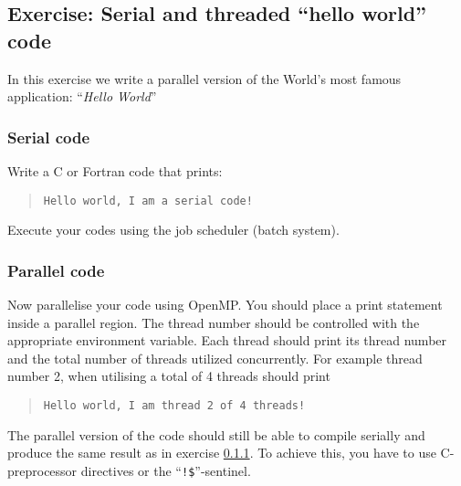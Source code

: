\subsection{Exercise: Serial and threaded ``hello world'' code}
In this exercise we write a parallel version of the World's most famous application: ``\textit{Hello World}'' 

\subsubsection{Serial code}\label{helloOMPexercise}
Write a C or Fortran code that prints:
\begin{quote}
\verb+Hello world, I am a serial code!+
\end{quote}
Execute your codes using the job scheduler (batch system).

\subsubsection{Parallel code}
Now parallelise your code using OpenMP.  You should place a print statement inside a parallel region.  The thread number should be controlled with the appropriate environment variable.  Each thread should print its thread number and the total number of threads utilized concurrently.  For example thread number 2, when utilising a total of 4 threads should print
\begin{quote}
\verb+Hello world, I am thread 2 of 4 threads!+
\end{quote}
The parallel version of the code should still be able to compile serially and produce the same result as in exercise \ref{helloOMPexercise}.  To achieve this, you have to use C-preprocessor directives or the ``\verb+!$+''-sentinel.
